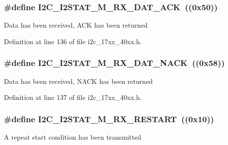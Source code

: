 \subsubsection[{\texorpdfstring{I2\+C\+\_\+\+I2\+S\+T\+A\+T\+\_\+\+M\+\_\+\+R\+X\+\_\+\+D\+A\+T\+\_\+\+A\+CK}{I2C_I2STAT_M_RX_DAT_ACK}}]{\setlength{\rightskip}{0pt plus 5cm}\#define I2\+C\+\_\+\+I2\+S\+T\+A\+T\+\_\+\+M\+\_\+\+R\+X\+\_\+\+D\+A\+T\+\_\+\+A\+CK~((0x50))}\hypertarget{group__I2C__17XX__40XX_ga2f07d3cfad351ba3c976d629db20cea2}{}\label{group__I2C__17XX__40XX_ga2f07d3cfad351ba3c976d629db20cea2}
Data has been received, A\+CK has been returned 

Definition at line 136 of file i2c\+\_\+17xx\+\_\+40xx.\+h.

\subsubsection[{\texorpdfstring{I2\+C\+\_\+\+I2\+S\+T\+A\+T\+\_\+\+M\+\_\+\+R\+X\+\_\+\+D\+A\+T\+\_\+\+N\+A\+CK}{I2C_I2STAT_M_RX_DAT_NACK}}]{\setlength{\rightskip}{0pt plus 5cm}\#define I2\+C\+\_\+\+I2\+S\+T\+A\+T\+\_\+\+M\+\_\+\+R\+X\+\_\+\+D\+A\+T\+\_\+\+N\+A\+CK~((0x58))}\hypertarget{group__I2C__17XX__40XX_ga9cc5203175775bfa5ae6df5d6d98b014}{}\label{group__I2C__17XX__40XX_ga9cc5203175775bfa5ae6df5d6d98b014}
Data has been received, N\+A\+CK has been returned 

Definition at line 137 of file i2c\+\_\+17xx\+\_\+40xx.\+h.

\subsubsection[{\texorpdfstring{I2\+C\+\_\+\+I2\+S\+T\+A\+T\+\_\+\+M\+\_\+\+R\+X\+\_\+\+R\+E\+S\+T\+A\+RT}{I2C_I2STAT_M_RX_RESTART}}]{\setlength{\rightskip}{0pt plus 5cm}\#define I2\+C\+\_\+\+I2\+S\+T\+A\+T\+\_\+\+M\+\_\+\+R\+X\+\_\+\+R\+E\+S\+T\+A\+RT~((0x10))}\hypertarget{group__I2C__17XX__40XX_gacb1c9145acd64a77464017f1dd9279c5}{}\label{group__I2C__17XX__40XX_gacb1c9145acd64a77464017f1dd9279c5}
A repeat start condition has been transmitted 

